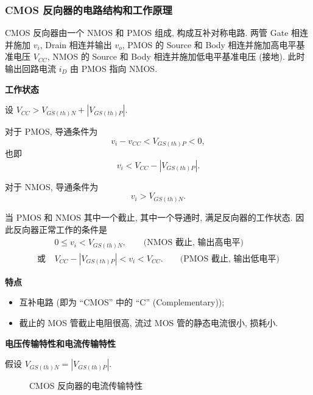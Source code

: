 \subsubsection{CMOS 反向器的电路结构和工作原理}
CMOS 反向器由一个 NMOS 和 PMOS 组成, 构成互补对称电路. 两管 Gate 相连并施加 $v_i$, Drain 相连并输出 $v_o$, PMOS 的 Source 和 Body 相连并施加高电平基准电压 $V_{CC}$, NMOS 的 Source 和 Body 相连并施加低电平基准电压 (接地). 此时输出回路电流 $i_D$ 由 PMOS 指向 NMOS.

\textbf{工作状态}

设 $V_{CC}>V_{GS(th)N}+|V_{GS(th)P}|$.

对于 PMOS, 导通条件为
\begin{equation*}
    v_i-v_{CC}<V_{GS(th)P}<0,
\end{equation*}
也即
\begin{equation}
    v_i<V_{CC}-|V_{GS(th)P}|.
\end{equation}

对于 NMOS, 导通条件为
\begin{equation}
    v_i>V_{GS(th)N}.
\end{equation}

当 PMOS 和 NMOS 其中一个截止, 其中一个导通时, 满足反向器的工作状态. 因此反向器正常工作的条件是
\begin{equation}
    \begin{aligned}
                   & 0\leq v_i<V_{GS(th)N}, \qquad \text{(NMOS 截止, 输出高电平)}           \\
        \text{或}\  & V_{CC}-|V_{GS(th)P}|<v_i<V_{CC}. \qquad \text{(PMOS 截止, 输出低电平)}
    \end{aligned}
\end{equation}

\textbf{特点}
\begin{itemize}
    \item 互补电路 (即为 ``CMOS'' 中的 ``C'' (Complementary));
    \item 截止的 MOS 管截止电阻很高, 流过 MOS 管的静态电流很小, 损耗小.
\end{itemize}

\textbf{电压传输特性和电流传输特性}

假设 $V_{GS(th)N}=|V_{GS(th)P}|$.
\begin{figure}[H]
    \begin{minipage}{.48\textwidth}
        \centering

        \caption{CMOS 反向器的电压传输特性}
    \end{minipage} \hfill
    \begin{minipage}{.48\textwidth}
        \centering

        \caption{CMOS 反向器的电流传输特性}
    \end{minipage}
\end{figure}

